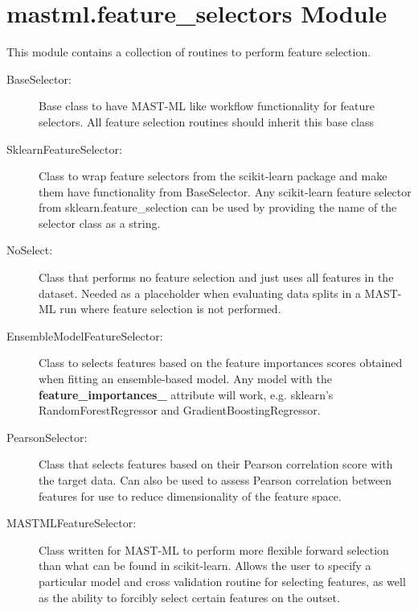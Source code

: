 \documentclass[letterpaper,10pt,english]{sphinxmanual}
\begin{document}
\section{mastml.feature\_selectors Module}
\label{\detokenize{6_feature_selectors:module-mastml.feature_selectors}}\label{\detokenize{6_feature_selectors:mastml-feature-selectors-module}}
This module contains a collection of routines to perform feature selection.
\begin{description}
\item[{BaseSelector:}] \leavevmode
Base class to have MAST-ML like workflow functionality for feature selectors. All feature selection routines
should inherit this base class

\item[{SklearnFeatureSelector:}] \leavevmode
Class to wrap feature selectors from the scikit-learn package and make them have functionality from
BaseSelector. Any scikit-learn feature selector from sklearn.feature\_selection can be used by providing the
name of the selector class as a string.

\item[{NoSelect:}] \leavevmode
Class that performs no feature selection and just uses all features in the dataset. Needed as a placeholder
when evaluating data splits in a MAST-ML run where feature selection is not performed.

\item[{EnsembleModelFeatureSelector:}] \leavevmode
Class to selects features based on the feature importances scores obtained when fitting an ensemble-based model.
Any model with the {\color{red}\bfseries{}feature\_importances\_} attribute will work, e.g. sklearn’s RandomForestRegressor and
GradientBoostingRegressor.

\item[{PearsonSelector:}] \leavevmode
Class that selects features based on their Pearson correlation score with the target data. Can also be used
to assess Pearson correlation between features for use to reduce dimensionality of the feature space.

\item[{MASTMLFeatureSelector:}] \leavevmode
Class written for MAST-ML to perform more flexible forward selection than what can be found in scikit-learn.
Allows the user to specify a particular model and cross validation routine for selecting features, as well as the
ability to forcibly select certain features on the outset.

\end{description}
\end{document}

